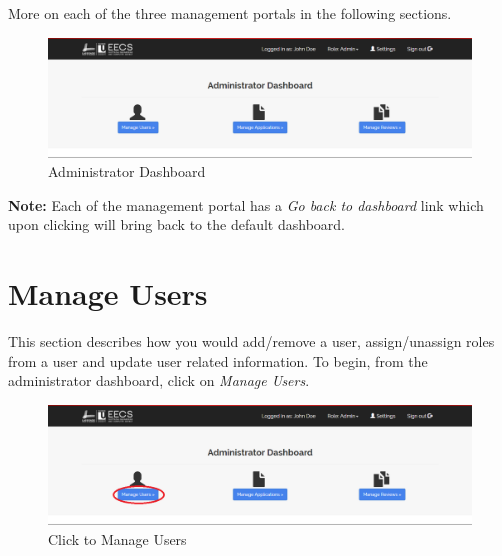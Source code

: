 \documentclass[fontsize=12pt,paper=letter,twoside]{scrartcl}
\begin{document}
\smallskip
\noindent More on each of the three management portals in the following sections.

\clearpage
\begin{figure}[!htb]
\begin{center}
\includegraphics[width=.99\textwidth]{images/admin_dash.png}
\end{center}
\caption{Administrator Dashboard}
\label{fig:admin_dash}
\end{figure}

\smallskip
\noindent \textbf{Note:} Each of the management portal has a \emph{Go back to dashboard} link which upon clicking will bring back to the default dashboard.


\newpage
\clearpage
\section{Manage Users} \label{m_user}
This section describes how you would add/remove a user, assign/unassign roles from a user and update user related information. To begin, from the administrator dashboard, click on \emph{Manage Users}.

\begin{figure}[!htb]
\begin{center}
\includegraphics[width=.99\textwidth]{images/mu/manage_user.png}
\end{center}
\caption{Click to Manage Users}
\label{fig:manage_user}
\end{figure}
\end{document}
